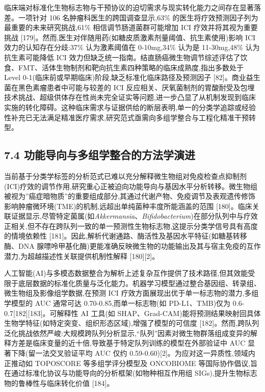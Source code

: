 \documentclass[11pt]{article}
\begin{document}
临床端对标准化生物标志物与干预协议的迫切需求与现实转化能力之间存在显著落差。一项针对 106 名肿瘤科医生的跨国调查显示,63\% 的医生将疗效预测因子列为最重要的未来研究挑战,61\% 相信调节肠道菌群可能增加 ICI 疗效并将其视为重要挑战 {[}179{]}。然而,医生对伴随用药(如糖皮质激素剂量阈值、抗生素使用)影响 ICI 效力的认知存在分歧:37\% 认为激素阈值在 0-10mg,34\% 认为是 11-30mg,48\% 认为抗生素可能降低 ICI 效力但缺乏统一指南。结直肠癌微生物调节综述评估了饮食、FMT、活体生物制剂和靶向抗生素四种策略的临床成熟度,指出多数处于 Level 0-1(临床前或早期临床)阶段,缺乏标准化临床路径及预测因子 {[}82{]}。商业益生菌在黑色素瘤患者中可能与较差的 ICI 反应相关、厌氧菌制剂的胃酸耐受及包埋技术挑战、超级供体存在性尚未完全证实等问题,进一步凸显了从机制发现到临床实施的转化障碍。这种临床需求与证据供给的断层表明,单一的分类学追踪或经验性补充已无法满足精准医疗需求,研究范式亟需向多组学整合与工程化精准干预转型。

\subsection{7.4 功能导向与多组学整合的方法学演进}\label{ux529fux80fdux5bfcux5411ux4e0eux591aux7ec4ux5b66ux6574ux5408ux7684ux65b9ux6cd5ux5b66ux6f14ux8fdb}

当前基于分类学标签的分析范式已难以充分解释微生物组对免疫检查点抑制剂(ICI)疗效的调节作用,研究重心正被迫向功能导向与基因水平分析转移。微生物组被视为''癌症暗物质''的重要组成部分,其通过代谢产物、免疫调节及表观遗传修饰影响肿瘤微环境(TME)的机制,远超出单纯菌种丰度所能涵盖的范围 {[}180{]}。临床关联证据显示,尽管特定菌属(如\emph{Akkermansia}、\emph{Bifidobacterium})在部分队列中与疗效正相关,但不存在跨队列一致的单一预测性生物标志物,这提示分类学信号具有高度的情境依赖性 {[}181{]}。因此,解析代谢通路、酶活性及基因水平特征(如糖基转移酶、DNA 腺嘌呤甲基化酶)更能准确反映微生物的功能输出及其与宿主免疫的互作潜力,为超越描述性关联提供机制性解释 {[}180{]}{[}2{]}。

人工智能(AI)与多模态数据整合为解析上述复杂互作提供了技术路径,但其效能受限于底层数据的标准化质量与泛化能力。机器学习模型通过整合基因组、转录组、微生物组及影像组学数据,在预测 ICI 疗效方面展现出优于单一标志物的潜力,多组学模型的 AUC 通常可达 0.70-0.85,而单一标志物(如 PD-L1、TMB)仅为 0.6-0.7{[}182{]}{[}183{]}。可解释性 AI 工具(如 SHAP、Grad-CAM)能将预测结果映射回具体生物学特征(如特定突变、组织形态区域),增强了模型的可信度 {[}182{]}。然而,跨队列泛化挑战依然严峻:大规模跨队列分析显示,``队列''因素对微生物群落组成变异的解释方差是临床变量的近十倍,导致基于特定队列训练的模型在外部验证中 AUC 显著下降(留一法交叉验证平均 AUC 仅约 0.59-0.60){[}2{]}。为应对这一异质性,领域内正推动如 TOPOSCORE 等多组学评分模型及 ONCOBIOME 等国际协作倡议,旨在通过标准化协议与功能导向的分析框架(如物种相互作用组 SIGs),提升生物标志物的鲁棒性与临床转化价值 {[}184{]}。
\end{document}
